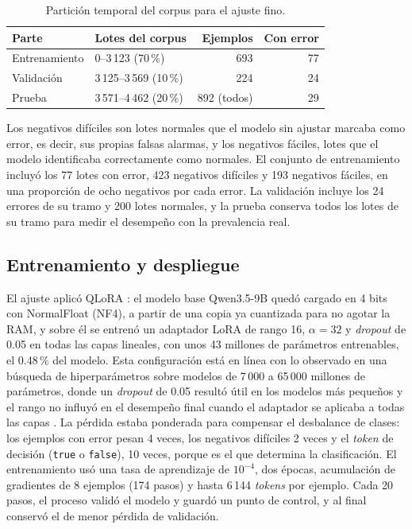 \begin{table}[H]
\centering
\caption{Partición temporal del corpus para el ajuste fino.}
\label{tab:met_particion}
\small
\begin{tabular}{@{}llrr@{}}
\toprule
\textbf{Parte} & \textbf{Lotes del corpus} & \textbf{Ejemplos} & \textbf{Con error} \\
\midrule
Entrenamiento & 0--3\,123 (70\,\%) & 693 & 77 \\
Validación & 3\,125--3\,569 (10\,\%) & 224 & 24 \\
Prueba & 3\,571--4\,462 (20\,\%) & 892 (todos) & 29 \\
\bottomrule
\end{tabular}
\normalsize
\end{table}

Los negativos difíciles son lotes normales que el modelo sin ajustar marcaba como error, es decir, sus propias falsas alarmas, y los negativos fáciles, lotes que el modelo identificaba correctamente como normales. El conjunto de entrenamiento incluyó los 77 lotes con error, 423 negativos difíciles y 193 negativos fáciles, en una proporción de ocho negativos por cada error. La validación incluye los 24 errores de su tramo y 200 lotes normales, y la prueba conserva todos los lotes de su tramo para medir el desempeño con la prevalencia real.

\subsection{Entrenamiento y despliegue}

El ajuste aplicó QLoRA \cite{dettmers2023_qlora}: el modelo base Qwen3.5-9B quedó cargado en 4 bits con NormalFloat (NF4), a partir de una copia ya cuantizada para no agotar la RAM, y sobre él se entrenó un adaptador LoRA de rango 16, $\alpha = 32$ y \textit{dropout} de 0.05 en todas las capas lineales, con unos 43 millones de parámetros entrenables, el 0.48\,\% del modelo. Esta configuración está en línea con lo observado en una búsqueda de hiperparámetros sobre modelos de 7\,000 a 65\,000 millones de parámetros, donde un \textit{dropout} de 0.05 resultó útil en los modelos más pequeños y el rango no influyó en el desempeño final cuando el adaptador se aplicaba a todas las capas \cite{dettmers2023_qlora}. La pérdida estaba ponderada para compensar el desbalance de clases: los ejemplos con error pesan 4 veces, los negativos difíciles 2 veces y el \textit{token} de decisión (\texttt{true} o \texttt{false}), 10 veces, porque es el que determina la clasificación. El entrenamiento usó una tasa de aprendizaje de $10^{-4}$, dos épocas, acumulación de gradientes de 8 ejemplos (174 pasos) y hasta 6\,144 \textit{tokens} por ejemplo. Cada 20 pasos, el proceso validó el modelo y guardó un punto de control, y al final conservó el de menor pérdida de validación.

